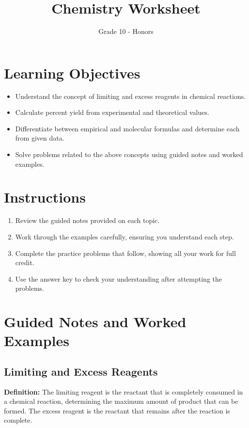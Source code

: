 \documentclass{article}
\title{Chemistry Worksheet}
\author{Grade 10 - Honors}
\date{}
\begin{document}
\maketitle

\section*{Learning Objectives}
\begin{itemize}
    \item Understand the concept of limiting and excess reagents in chemical reactions.
    \item Calculate percent yield from experimental and theoretical values.
    \item Differentiate between empirical and molecular formulas and determine each from given data.
    \item Solve problems related to the above concepts using guided notes and worked examples.
\end{itemize}

\section*{Instructions}
\begin{enumerate}
    \item Review the guided notes provided on each topic.
    \item Work through the examples carefully, ensuring you understand each step.
    \item Complete the practice problems that follow, showing all your work for full credit.
    \item Use the answer key to check your understanding after attempting the problems.
\end{enumerate}

\section*{Guided Notes and Worked Examples}

\subsection*{Limiting and Excess Reagents}
\textbf{Definition:} The limiting reagent is the reactant that is completely consumed in a chemical reaction, determining the maximum amount of product that can be formed. The excess reagent is the reactant that remains after the reaction is complete.
\end{document}
